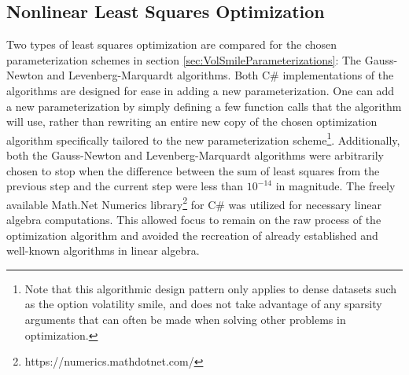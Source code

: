 \documentclass[12pt, a4paper, notitlepage]{article}
\numberwithin{equation}{subsection}
\numberwithin{figure}{subsection}
\numberwithin{table}{subsection}
\newcommand{\newpar}{\newline \newline}
\begin{document}
\subsection{Nonlinear Least Squares Optimization}
Two types of least squares optimization are compared for the chosen parameterization schemes in section \ref{sec:VolSmileParameterizations}:  The Gauss-Newton and Levenberg-Marquardt algorithms.  Both C\# implementations of the algorithms are designed for ease in adding a new parameterization.  One can add a new parameterization by simply defining a few function calls that the algorithm will use, rather than rewriting an entire new copy of the chosen optimization algorithm specifically tailored to the new parameterization scheme\footnote{Note that this algorithmic design pattern only applies to dense datasets such as the option volatility smile, and does not take advantage of any sparsity arguments that can often be made when solving other problems in optimization.}.  Additionally, both the Gauss-Newton and Levenberg-Marquardt algorithms were arbitrarily chosen to stop when the difference between the sum of least squares from the previous step and the current step were less than $10^{-14}$ in magnitude.
\newpar
The freely available Math.Net Numerics library\footnote{https://numerics.mathdotnet.com/} for C\# was utilized for necessary linear algebra computations.  This allowed focus to remain on the raw process of the optimization algorithm and avoided the recreation of already established and well-known algorithms in linear algebra.
\end{document}
